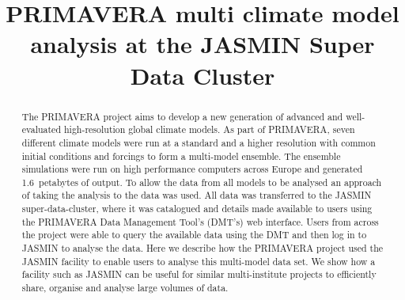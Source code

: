 \documentclass[gmd, manuscript]{copernicus}
\begin{document}
\title{PRIMAVERA multi climate model analysis at the JASMIN Super Data Cluster}













\received{}
\pubdiscuss{} %
\revised{}
\accepted{}
\published{}




\maketitle



\begin{abstract}
The PRIMAVERA project aims to develop a new generation of advanced and well-evaluated high-resolution global climate models. As part of PRIMAVERA, seven different climate models were run at a standard and a higher resolution with common initial conditions and forcings to form a multi-model ensemble. The ensemble simulations were run on high performance computers across Europe and generated 1.6~petabytes of output. To allow the data from all models to be analysed an approach of taking the analysis to the data was used. All data was transferred to the JASMIN super-data-cluster, where it was catalogued and details made available to users using the PRIMAVERA Data Management Tool's (DMT's) web interface. Users from across the project were able to query the available data using the DMT and then log in to JASMIN to analyse the data. Here we describe how the PRIMAVERA project used the JASMIN facility to enable users to analyse this multi-model data set. We show how a facility such as JASMIN can be useful for similar multi-institute projects to efficiently share, organise and analyse large volumes of data.
\end{abstract}
\end{document}
